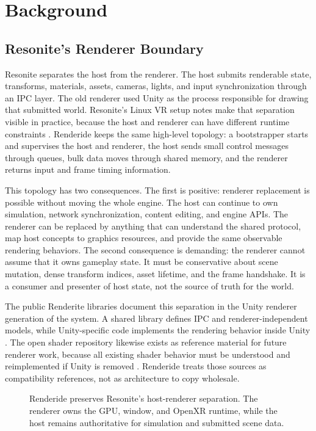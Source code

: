 \documentclass[acmtog,screen,nonacm]{acmart}
\begin{document}
\section{Background}

\subsection{Resonite's Renderer Boundary}

Resonite separates the host from the renderer. The host submits renderable state, transforms, materials, assets, cameras, lights, and input synchronization through an IPC layer. The old renderer used Unity as the process responsible for drawing that submitted world. Resonite's Linux VR setup notes make that separation visible in practice, because the host and renderer can have different runtime constraints \citep{resoniteLinuxVrSetup}. Renderide keeps the same high-level topology: a bootstrapper starts and supervises the host and renderer, the host sends small control messages through queues, bulk data moves through shared memory, and the renderer returns input and frame timing information.

This topology has two consequences. The first is positive: renderer replacement is possible without moving the whole engine. The host can continue to own simulation, network synchronization, content editing, and engine APIs. The renderer can be replaced by anything that can understand the shared protocol, map host concepts to graphics resources, and provide the same observable rendering behaviors. The second consequence is demanding: the renderer cannot assume that it owns gameplay state. It must be conservative about scene mutation, dense transform indices, asset lifetime, and the frame handshake. It is a consumer and presenter of host state, not the source of truth for the world.

The public Renderite libraries document this separation in the Unity renderer generation of the system. A shared library defines IPC and renderer-independent models, while Unity-specific code implements the rendering behavior inside Unity \citep{renderiteRepo,unityRendererRepo}. The open shader repository likewise exists as reference material for future renderer work, because all existing shader behavior must be understood and reimplemented if Unity is removed \citep{resoniteUnityShaders}. Renderide treats those sources as compatibility references, not as architecture to copy wholesale.

\begin{figure}
  \centering
  
  \caption{Renderide preserves Resonite's host-renderer separation. The renderer owns the GPU, window, and OpenXR runtime, while the host remains authoritative for simulation and submitted scene data.}
  \label{fig:topology}
\end{figure}
\end{document}
